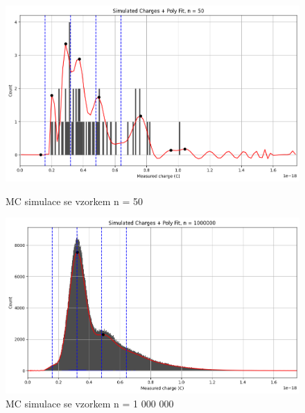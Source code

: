 \documentclass[czech,11pt,a4paper]{article}
\begin{document}
\begin{multicols}{2}
		 \begin{figure}[H]
		 	\centering
		 	\includegraphics[width=0.8\linewidth]{histogamMC4}
		 	\caption{MC simulace se vzorkem n = 50}
		 	\includegraphics[width=0.8\linewidth]{histogramMC5}
		 	\caption{MC simulace se vzorkem n = 1 000 000}

		 \end{figure}

\end{multicols}
\end{document}

